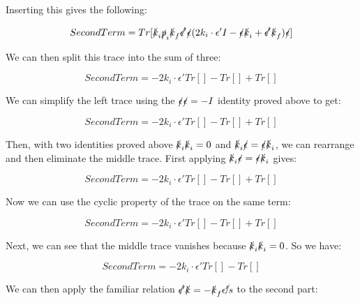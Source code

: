 \documentclass[a4]{article}
\begin{document}
    Inserting this gives the following:

    \begin{equation}
        Second Term = Tr [\slashed{k}_i \slashed{p}_i \slashed{k}_f \slashed{\epsilon'} \slashed{\epsilon} (2 k_i \cdot \epsilon' I - \slashed{\epsilon} \slashed{k}_i + \slashed{\epsilon'} \slashed{k}_f) \slashed{\epsilon}]
    \end{equation}

    We can then split this trace into the sum of three:

    \begin{equation}
        Second Term = - 2 k_i \cdot \epsilon' Tr [] - Tr [] + Tr []
    \end{equation}

    We can simplify the left trace using the $\slashed{\epsilon} \slashed{\epsilon} = - I$ identity proved above to get:

    \begin{equation}
        Second Term = - 2 k_i \cdot \epsilon' Tr [] - Tr [] + Tr []
    \end{equation}

    Then, with two identities proved above $\slashed{k}_i \slashed{k}_i = 0$ and $\slashed{k}_i \slashed{\epsilon} = \slashed{\epsilon} \slashed{k}_i$, we can rearrange and then eliminate the middle trace. First applying 
    $\slashed{k}_i \slashed{\epsilon} = \slashed{\epsilon} \slashed{k}_i$ gives:

    \begin{equation}
        Second Term = - 2 k_i \cdot \epsilon' Tr [] - Tr [] + Tr []
    \end{equation}

    Now we can use the cyclic property of the trace on the same term:

    \begin{equation}
        Second Term = - 2 k_i \cdot \epsilon' Tr [] - Tr [] + Tr []
    \end{equation}

    Next, we can see that the middle trace vanishes because $\slashed{k}_i \slashed{k}_i = 0$. So we have:

    \begin{equation}
        Second Term = - 2 k_i \cdot \epsilon' Tr [] - Tr []
    \end{equation}

    We can then apply the familiar relation $\slashed{\epsilon'} \slashed{k} = - \slashed{k}_f \slashed{\epsilon's}$ to the second part:
\end{document}
